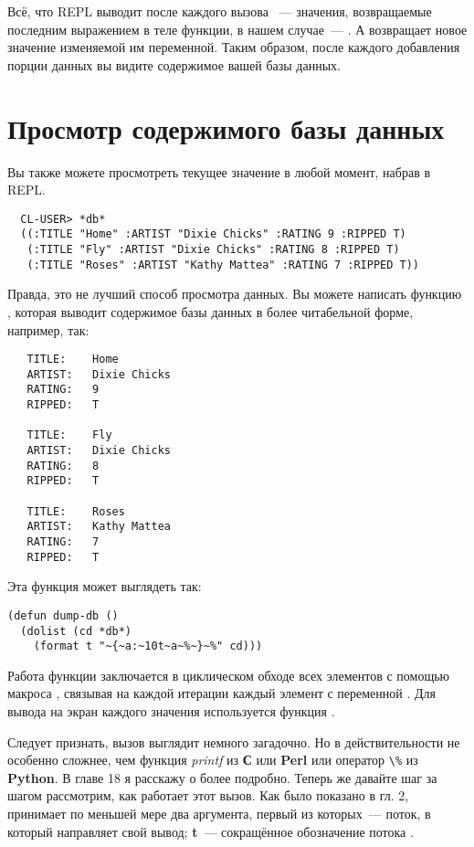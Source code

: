 Всё, что REPL выводит после каждого вызова ~--- значения, возвращаемые
последним выражением в теле функции, в нашем случае~--- . А 
возвращает новое значение изменяемой им переменной. Таким образом, после каждого
добавления порции данных вы видите содержимое вашей базы данных.

\section{Просмотр содержимого базы данных}

Вы также можете просмотреть текущее значение  в любой момент,
набрав  в REPL.

\begin{verbatim}
  CL-USER> *db*
  ((:TITLE "Home" :ARTIST "Dixie Chicks" :RATING 9 :RIPPED T)
   (:TITLE "Fly" :ARTIST "Dixie Chicks" :RATING 8 :RIPPED T)
   (:TITLE "Roses" :ARTIST "Kathy Mattea" :RATING 7 :RIPPED T))
\end{verbatim}

Правда, это не лучший способ просмотра данных. Вы можете написать функцию ,
которая выводит содержимое базы данных в более читабельной форме, например, так:

\begin{verbatim}
   TITLE:    Home
   ARTIST:   Dixie Chicks
   RATING:   9
   RIPPED:   T
   
   TITLE:    Fly
   ARTIST:   Dixie Chicks
   RATING:   8
   RIPPED:   T
   
   TITLE:    Roses
   ARTIST:   Kathy Mattea
   RATING:   7
   RIPPED:   T
\end{verbatim}

Эта функция может выглядеть так:

\begin{lstlisting}
(defun dump-db ()
  (dolist (cd *db*)
    (format t "~{~a:~10t~a~%~}~%" cd)))
\end{lstlisting}

Работа функции заключается в циклическом обходе всех элементов  с помощью макроса
, связывая на каждой итерации каждый элемент с переменной . Для
вывода на экран каждого значения  используется функция .

Следует признать, вызов  выглядит немного загадочно. Но в действительности
 не особенно сложнее, чем функция \textit{printf} из \textbf{С} или
\textbf{Perl} или оператор \lstinline!\%! из \textbf{Python}. В главе 18 я расскажу о
 более подробно. Теперь же давайте шаг за шагом рассмотрим, как работает этот
вызов. Как было показано в гл. 2,  принимает по меньшей мере два аргумента,
первый из которых~--- поток, в который  направляет свой вывод; \textbf{t}~---
сокращённое обозначение потока .

